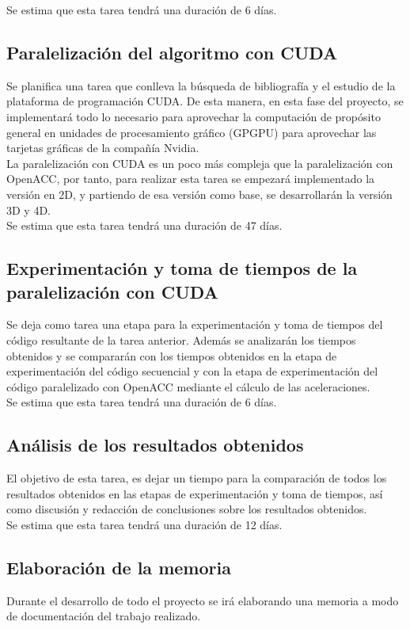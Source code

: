 Se estima que esta tarea tendrá una duración de 6 días.

\subsection{Paralelización del algoritmo con CUDA}
Se planifica una tarea que conlleva la búsqueda de bibliografía y el estudio de la plataforma de programación CUDA. De esta manera, en esta fase del proyecto, se implementará todo lo necesario para aprovechar la computación de propósito general en unidades de procesamiento gráfico (GPGPU) para aprovechar las tarjetas gráficas de la compañía Nvidia.\\

La paralelización con CUDA es un poco más compleja que la paralelización con OpenACC, por tanto, para realizar esta tarea se empezará implementado la versión en 2D, y partiendo de esa versión como base, se desarrollarán la versión 3D y 4D.\\

Se estima que esta tarea tendrá una duración de 47 días.

\subsection{Experimentación y toma de tiempos de la paralelización con CUDA}
Se deja como tarea una etapa para la experimentación y toma de tiempos del código resultante de la tarea anterior. Además se analizarán los tiempos obtenidos y se compararán con los tiempos obtenidos en la etapa de experimentación del código secuencial y con la etapa de experimentación del código paralelizado con OpenACC mediante el cálculo de las aceleraciones.\\

Se estima que esta tarea tendrá una duración de 6 días.

\subsection{Análisis de los resultados obtenidos}
El objetivo de esta tarea, es dejar un tiempo para la comparación de todos los resultados obtenidos en las etapas de experimentación y toma de tiempos, así como discusión y redacción de conclusiones sobre los resultados obtenidos.\\

Se estima que esta tarea tendrá una duración de 12 días.

\subsection{Elaboración de la memoria}
Durante el desarrollo de todo el proyecto se irá elaborando una memoria a modo de documentación del trabajo realizado.

